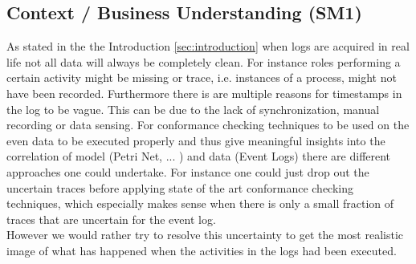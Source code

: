\documentclass[
	a4paper,
	pagesize,
	pdftex,
	12pt,
	ngerman,
	fleqn,
	final,
	]{scrartcl}
\theoremstyle{plain}
\theoremstyle{definition}
\begin{document}
	
	\subsection{Context / Business Understanding (SM1)}
	As stated in the the Introduction \ref{sec:introduction} when logs are acquired in real life not all data will 
	always be completely clean. For instance roles performing a certain activity might be missing or trace, i.e. instances
	of a process, might not have been recorded. Furthermore there is are multiple reasons for timestamps in the log to be vague. This can be due to the lack of synchronization, manual recording or data sensing. \cite{self}
	For conformance checking techniques to be used on the even data to be executed properly and thus give meaningful insights into the correlation of model (Petri Net, ... ) and data (Event Logs) there are different approaches one could undertake. For instance one could just drop out the uncertain traces before applying state of the art conformance checking techniques, which especially makes sense when there is only a small fraction of traces that are uncertain for the event log. \\ However we would rather try to resolve this uncertainty to get the most realistic image of what has happened when the activities in the logs had been executed. 
	
\end{document}
